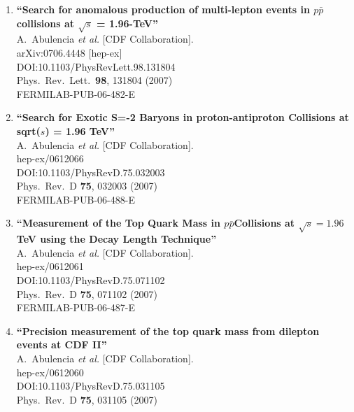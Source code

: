 \documentclass{article}
\begin{document}
\begin{enumerate}
\item%
{\bf ``Search for anomalous production of multi-lepton events in $p \bar{p}$ collisions at $\sqrt{s}$ = 1.96-TeV''}
  \\{}A.~Abulencia {\it et al.} [CDF Collaboration].
  \\{}arXiv:0706.4448 [hep-ex]
  \\{}DOI:10.1103/PhysRevLett.98.131804
  \\{}Phys.\ Rev.\ Lett.\  {\bf 98}, 131804 (2007)
  \\{}FERMILAB-PUB-06-482-E
\item%
{\bf ``Search for Exotic S=-2 Baryons in proton-antiproton Collisions at sqrt($s$) = 1.96 TeV''}
  \\{}A.~Abulencia {\it et al.} [CDF Collaboration].
  \\{}hep-ex/0612066
  \\{}DOI:10.1103/PhysRevD.75.032003
  \\{}Phys.\ Rev.\ D {\bf 75}, 032003 (2007)
  \\{}FERMILAB-PUB-06-488-E
\item%
{\bf ``Measurement of the Top Quark Mass in $p\bar{p}$Collisions at $\sqrt{s} = 1.96$ TeV using the Decay Length Technique''}
  \\{}A.~Abulencia {\it et al.} [CDF Collaboration].
  \\{}hep-ex/0612061
  \\{}DOI:10.1103/PhysRevD.75.071102
  \\{}Phys.\ Rev.\ D {\bf 75}, 071102 (2007)
  \\{}FERMILAB-PUB-06-487-E
\item%
{\bf ``Precision measurement of the top quark mass from dilepton events at CDF II''}
  \\{}A.~Abulencia {\it et al.} [CDF Collaboration].
  \\{}hep-ex/0612060
  \\{}DOI:10.1103/PhysRevD.75.031105
  \\{}Phys.\ Rev.\ D {\bf 75}, 031105 (2007)

\end{enumerate}
\end{document}
